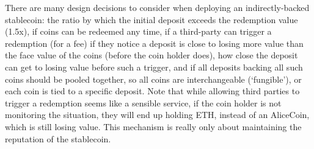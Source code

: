 There are many design decisions to consider when deploying an indirectly-backed stablecoin: the ratio by which the initial deposit exceeds the redemption value (\eg 1.5x), if coins can be redeemed any time, if a third-party can trigger a redemption (\eg for a fee) if they notice a deposit is close to losing more value than the face value of the coins (before the coin holder does), how close the deposit can get to losing value before such a trigger, and if all deposits backing all such coins should be pooled together, so all coins are interchangeable (`fungible'), or each coin is tied to a specific deposit. Note that while allowing third parties to trigger a redemption seems like a sensible service, if the coin holder is not monitoring the situation, they will end up holding ETH, instead of an AliceCoin, which is still losing value. This mechanism is really only about maintaining the reputation of the stablecoin.



